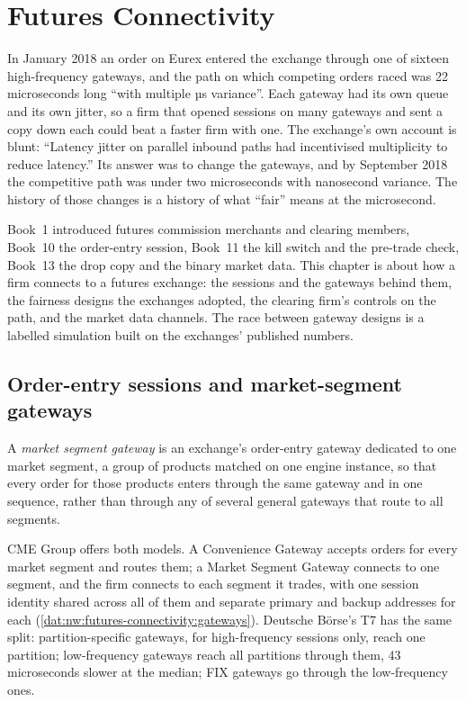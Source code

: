\chapter{Futures Connectivity}\label{ch:nw:futures-connectivity}

In January 2018 an order on Eurex entered the exchange through one of sixteen high-frequency gateways, and the path on
which competing orders raced was 22 microseconds long ``with multiple µs variance''. Each gateway had its own queue and its
own jitter, so a firm that opened sessions on many gateways and sent a copy down each could beat a faster firm with one. The
exchange's own account is blunt: ``Latency jitter on parallel inbound paths had incentivised multiplicity to reduce latency.''
Its answer was to change the gateways, and by September 2018 the competitive path was under two microseconds with
nanosecond variance. The history of those changes is a history of what ``fair'' means at the microsecond.

Book~1 introduced futures commission merchants and clearing members, Book~10 the order-entry session, Book~11 the kill
switch and the pre-trade check, Book~13 the drop copy and the binary market data. This chapter is about how a firm connects
to a futures exchange: the sessions and the gateways behind them, the fairness designs the exchanges adopted, the clearing
firm's controls on the path, and the market data channels. The race between gateway designs is a labelled simulation built
on the exchanges' published numbers.

\section{Order-entry sessions and market-segment gateways}

\begin{definition}\label{def:nw:futures-connectivity:msgw}
A \emph{market segment gateway} is an exchange's order-entry gateway dedicated to one market
segment, a group of products matched on one engine instance, so that every order for those products enters through the same
gateway and in one sequence, rather than through any of several general gateways that route to all segments.
\end{definition}

CME Group offers both models. A Convenience Gateway accepts orders for every market segment and routes them; a Market Segment
Gateway connects to one segment, and the firm connects to each segment it trades, with one session identity shared across all
of them and separate primary and backup addresses for each (\cref{dat:nw:futures-connectivity:gateways}). Deutsche Börse's T7
has the same split: partition-specific gateways, for high-frequency sessions only, reach one partition; low-frequency gateways
reach all partitions through them, 43 microseconds slower at the median; FIX gateways go through the low-frequency ones.

